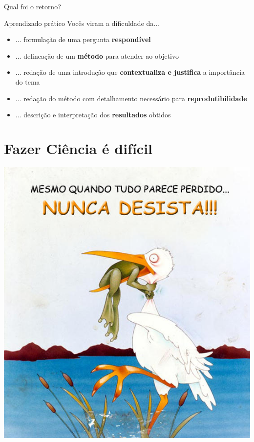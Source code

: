 \documentclass{beamer}
\begin{document}
\begin{frame}{\scriptsize Qual foi o retorno?}
  \begin{block}{Aprendizado prático}
    {\tiny \centering Vocês viram a dificuldade da...}
    \bigskip
    \begin{itemize}
      \scriptsize
    \item<1,6> ... formulação de uma pergunta {\bf respondível}
      \bigskip
    \item<2,6> ... delineação de um {\bf método} para atender ao objetivo
      \bigskip
    \item<3,6> {... redação de uma introdução que {\bf contextualiza e justifica} a importância do tema}
      \bigskip
    \item<4,6> ... redação do método com detalhamento necessário para {\bf reprodutibilidade} 
      \bigskip
    \item<5,6> ... descrição e interpretação dos {\bf resultados} obtidos
    \end{itemize}
  \end{block}
    \vfill
\end{frame}

\section{Fazer Ciência é difícil}

\begin{frame}
  \begin{center}
    \includegraphics[height=.75\textheight]{Encerramento/naodesista3}

    \vfill
  \end{center}
\end{frame}
\end{document}
